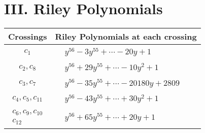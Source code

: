 \documentclass[1p]{elsarticle_modified}
\theoremstyle{definition}
\begin{document}
\centering \section*{ III. Riley Polynomials}
\begin{tabular}{m{50pt}|m{274pt}}
Crossings & \hspace{64pt}Riley Polynomials at each crossing \\
\hline $$\begin{aligned}c_{1}\end{aligned}$$&$\begin{aligned}
&y^{56}-3 y^{55}+\cdots-20 y+1
\end{aligned}$\\
\hline $$\begin{aligned}c_{2},c_{8}\end{aligned}$$&$\begin{aligned}
&y^{56}+29 y^{55}+\cdots-10 y^2+1
\end{aligned}$\\
\hline $$\begin{aligned}c_{3},c_{7}\end{aligned}$$&$\begin{aligned}
&y^{56}-35 y^{55}+\cdots-20180 y+2809
\end{aligned}$\\
\hline $$\begin{aligned}c_{4},c_{5},c_{11}\end{aligned}$$&$\begin{aligned}
&y^{56}-43 y^{55}+\cdots+30 y^2+1
\end{aligned}$\\
\hline $$\begin{aligned}c_{6},c_{9},c_{10}\\c_{12}\end{aligned}$$&$\begin{aligned}
&y^{56}+65 y^{55}+\cdots+20 y+1
\end{aligned}$\\
\hline
\end{tabular}
\vskip 2pc
\end{document}
